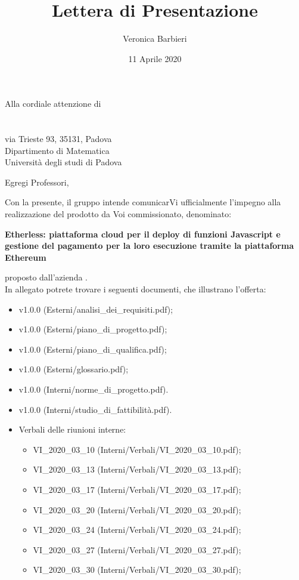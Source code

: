 \documentclass[a4paper]{letter}
\title{Lettera di Presentazione}
\author{Veronica Barbieri}
\begin{document}
\begin{letter} {Alla cordiale attenzione di \\ \TV \\ \RC \\ via Trieste 93, 35131, Padova\\ Dipartimento di Matematica \\ Università degli studi di Padova }
  \vspace*{-0.4\baselineskip}
\date{11 Aprile 2020}
\opening{Egregi Professori,}
  Con la presente, il gruppo \Gruppo{} intende comunicarVi ufficialmente l'impegno alla realizzazione del prodotto da Voi commissionato, denominato:
  \begin{center}
    \textbf{Etherless: piattaforma cloud per il deploy di funzioni Javascript e gestione del pagamento per la loro esecuzione tramite la piattaforma Ethereum}
  \end{center}
  proposto dall'azienda \Proponente.\\
  In allegato potrete trovare i seguenti documenti, che illustrano l'offerta:
  \begin{itemize}
    \item \AdR{} v1.0.0 (Esterni/analisi\_dei\_requisiti.pdf);
    \item \PdP{} v1.0.0 (Esterni/piano\_di\_progetto.pdf);
    \item \PdQ{} v1.0.0 (Esterni/piano\_di\_qualifica.pdf);
    \item \Glossario{} v1.0.0 (Esterni/glossario.pdf);
    \item \NdP{} v1.0.0 (Interni/norme\_di\_progetto.pdf).
    \item \SdF{} v1.0.0 (Interni/studio\_di\_fattibilità.pdf).
    \item Verbali delle riunioni interne:
      \begin{itemize}
        \item VI\_2020\_03\_10 (Interni/Verbali/VI\_2020\_03\_10.pdf);
        \item VI\_2020\_03\_13 (Interni/Verbali/VI\_2020\_03\_13.pdf);
        \item VI\_2020\_03\_17 (Interni/Verbali/VI\_2020\_03\_17.pdf);
        \item VI\_2020\_03\_20 (Interni/Verbali/VI\_2020\_03\_20.pdf);
        \item VI\_2020\_03\_24 (Interni/Verbali/VI\_2020\_03\_24.pdf);
        \item VI\_2020\_03\_27 (Interni/Verbali/VI\_2020\_03\_27.pdf);
        \item VI\_2020\_03\_30 (Interni/Verbali/VI\_2020\_03\_30.pdf);

\end{itemize}
\end{itemize}
\end{letter}
\end{document}
